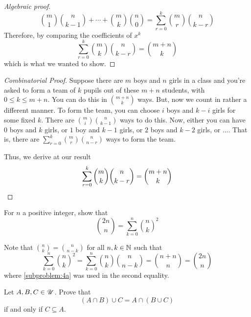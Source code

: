 \documentclass[a4paper, english, 12pt]{article} %
\begin{document}
\begin{answer}
\begin{proof}[Algebraic proof]
\begin{equation*}
      \binom{m}{1}\binom{n}{k-1} + \cdots +
      \binom{m}{k}\binom{n}{0}
      = \sum_{r = 0}^{k} \binom{m}{r} \binom{n}{k - r}
    \end{equation*}
    Therefore, by comparing the coefficients of $x^k$
    \begin{equation*}
      \sum_{r = 0}^k \binom{m}{k} \binom{n}{k - r} = \binom{m + n}{k}
    \end{equation*}
    which is what we wanted to show.
  \end{proof}
  \begin{proof}[Combinatorial Proof]
    Suppose there are $m$ boys and $n$ girls in a class and you're asked to form
    a team of $k$ pupils out of these $m+n$ students, with $0 \leq k \leq m +
    n$. You can do this in $\binom{m+n}{k}$ ways. But, now we count in rather a
    different manner. To form the team, you can choose $i$ boys and $k-i$ girls
    for some fixed $k$. There are $\binom{m}{i}\binom{n}{k-1}$ ways to do this.
    Now, either you can have $0$ boys and $k$ girls, or $1$ boy and $k-1$ girls,
    or $2$ boys and $k-2$ girls, or $\ldots$. That is, there are $\sum_{r=0}^k
    \binom{m}{r}\binom{n}{n-r}$ ways to form the team.

    Thus, we derive at our result
    \begin{equation*}
      \sum_{r = 0}^k \binom{m}{k} \binom{n}{k - r} = \binom{m + n}{k} \qedhere
    \end{equation*}
  \end{proof}
\end{answer}

\begin{subproblem}
  For $n$ a positive integer, show that
  \begin{equation*}
    \binom{2n}{n} = \sum_{k = 0}^{n} \binom{n}{k}^2
  \end{equation*}
\end{subproblem}

\begin{answer}
  Note that $\binom{n}{k}=\binom{n}{n-k}$ for all $n,k \in \mathbb{N}$ such that
  \begin{equation*}
    \sum_{k=0}^{n} \binom{n}{k}^2
    = \sum_{k=0}^{n} \binom{n}{k} \binom{n}{n-k}
    = \binom{n+n}{n} = \binom{2n}{n}
  \end{equation*}
  where \cref{subproblem:4a} was used in the second equality.
\end{answer}

\begin{problem}[9]
  Let $A, B, C \in \mathscr{U}$. Prove that
  \begin{equation*}
    (A \cap B) \cup C = A \cap (B \cup C)
  \end{equation*}
  if and only if $ C \subseteq A$.
\end{problem}
\end{document}
